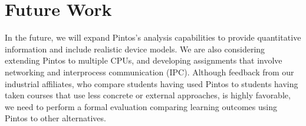 \section{Future Work}

In the future, we will expand Pintos's analysis capabilities to
provide quantitative information  and include realistic
device models.
We are also considering extending Pintos to multiple
CPUs, and developing assignments that involve
networking and interprocess communication (IPC).
Although feedback from our industrial affiliates, who compare
students having used Pintos to students having taken courses 
that use less concrete or external approaches, is highly favorable,
we need to perform a formal evaluation comparing learning 
outcomes using Pintos to other alternatives.
